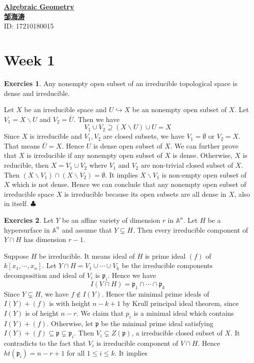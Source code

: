 \documentclass[12pt,a4paper]{article}
\theoremstyle{definition}
\newtheorem{exer}{Exercies}[subsection]
\newcommand*{\qeds}{\hfill\ensuremath{\clubsuit}}
\begin{document}
\noindent
{\LARGE\underline{\textbf{Algebraic Geometry}}}\\
{\hfill\large  \underline{\textbf{邹海涛}} \\
	\hfill ID: 17210180015}\\
\section{Week 1}
\begin{exer}
	Any nonempty open subset of an irreducible topological space is dense and irreducible.
\end{exer}
Let $X$ be an irreducible space and $U \hookrightarrow X$ be an nonempty open subset of $X$. Let $V_1= X\backslash U $ and $V_2= \bar{U}$. Then we have
\[
V_1 \cup V_2 \supseteq (X \backslash U) \cup U =X
\]
Since $X$ is irreducible and $V_1, V_2$ are closed subsets, we have $V_1 = \emptyset$ or $V_2 = X$. That means $\bar{U} =X$. Hence $U$ is dense open subset of $X$.
We can further prove that $X$ is irreducible if any nonempty open subset of $X$ is dense. Otherwise, $X$ is reducible, then $X = V_1 \cup V_2$ where $V_1$ and $V_2$ are non-trivial closed subset of $X$. Then $(X\backslash V_1) \cap (X\backslash V_2) = \emptyset$. It implies $X\backslash V_1$ is non-empty open subset of $X$ which is not dense. Hence we can conclude that any nonempty open subset of irreducible space $X$ is irreducible because its open subsets are all dense in $X$, also in itself.
\qeds
\begin{exer}
	Let $Y$ be an affine variety of dimension $r$ in $\mathbb{A}^n$. Let $H$ be a hypersurface in $\mathbb{A}^n$ and assume that $Y \subsetneq H$. Then every irreducible component of $Y \cap H$ has dimension $r-1$.
\end{exer}
Suppose $H$ be irreducible. It means ideal of $H$ is prime ideal $(f)$ of $k[x_1, \cdots, x_n]$. Let $Y \cap H = V_1 \cup \cdots \cup V_k$ be the irreducible components decomposition and ideal of $V_i$ is $\mathfrak{p}_i$. Hence we have
\[
I(V \cap H) = \mathfrak{p}_1 \cap \cdots \cap \mathfrak{p}_k
\]
Since $Y \varsubsetneq H$, we have $f \notin I(Y)$. Hence the minimal prime ideals of $I(Y) + (f)$ is with height $n-k+1$ by Krull principal ideal theorem, since $I(Y)$ is of height $n-r$. We claim that $ p_i$ is a minimal ideal which contains $I(Y) + (f)$. Otherwise, let $\mathfrak{p}$ be the minimal prime ideal satisfying $I(Y)+(f) \subseteq \mathfrak{p} \subsetneq \mathfrak{p}_i$. Then $V_i \subsetneq Z(\mathfrak{p})$, a irreducible closed subset of $X$. It contradicts to the fact that $V_i$ is irreducible component of $V \cap H$. Hence $ht(\mathfrak{p}_i) = n-r+1$ for all $1 \leq i \leq k$. It implies 
\end{document}
